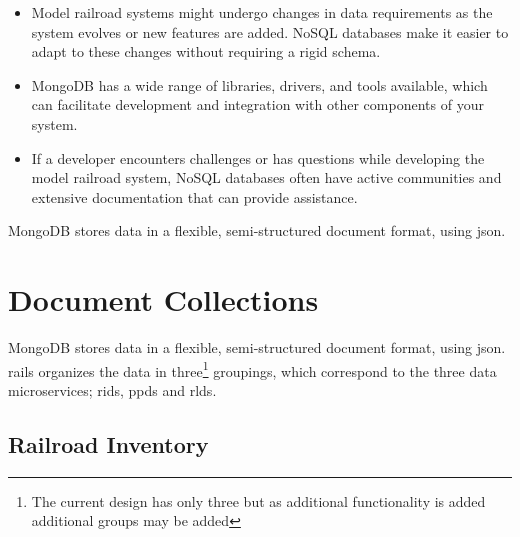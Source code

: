 \begin{itemize}
\item  Model railroad systems might undergo changes in data requirements as the system evolves or new features are added. NoSQL databases make it easier to adapt to these changes without requiring a rigid schema.
\item  MongoDB has a wide range of libraries, drivers, and tools available, which can facilitate development and integration with other components of your system.
\item  If a developer encounters challenges or has questions while developing the model railroad system, NoSQL databases often have active communities and extensive documentation that can provide assistance.
\end{itemize}
MongoDB stores data in a flexible, semi-structured document format, using \gls{json}.
\section{Document Collections}
MongoDB stores data in a flexible, semi-structured document format, using \gls{json}. \gls{rails} organizes the data in three\footnote{The current design has only three but as additional functionality is added additional groups may be added} groupings, which correspond to the three data microservices; \gls{rids}, \gls{ppds} and \gls{rlds}.
\subsection{Railroad Inventory}
